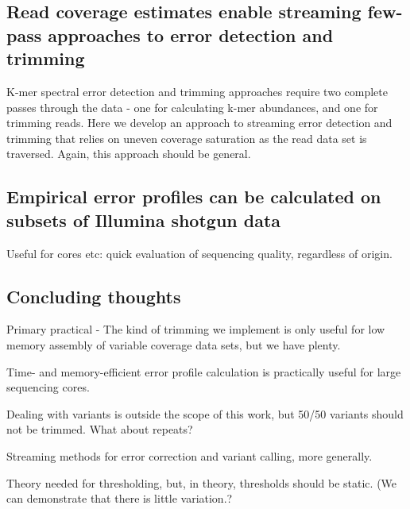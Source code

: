 \subsection{Read coverage estimates enable streaming few-pass approaches to error detection and trimming}

K-mer spectral error detection and trimming approaches require two
complete passes through the data - one for calculating k-mer
abundances, and one for trimming reads.  Here we develop an approach
to streaming error detection and trimming that relies on uneven
coverage saturation as the read data set is traversed.  Again, this
approach should be general.



\subsection{Empirical error profiles can be calculated on subsets of Illumina shotgun data}

Useful for cores etc: quick evaluation of sequencing quality, regardless
of origin.

\subsection{Concluding thoughts}

Primary practical - The kind of trimming we implement is only useful
for low memory assembly of variable coverage data sets, but we have
plenty.

Time- and memory-efficient error profile calculation is practically useful
for large sequencing cores.

Dealing with variants is outside the scope of this work, but 50/50
variants should not be trimmed.  What about repeats?

Streaming methods for error correction and variant calling, more generally.

Theory needed for thresholding, but, in theory, thresholds should be
static.  (We can demonstrate that there is little variation.?


